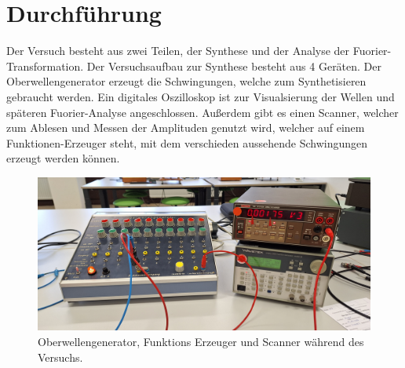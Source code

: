 \section{Durchführung}
\label{sec:Durchführung}
Der Versuch besteht aus zwei Teilen, der Synthese und der Analyse der Fuorier-Transformation.
Der Versuchsaufbau zur Synthese besteht aus 4 Geräten. Der Oberwellengenerator erzeugt die Schwingungen, welche zum 
Synthetisieren gebraucht werden. Ein digitales Oszilloskop ist zur Visualsierung der Wellen und späteren Fuorier-Analyse angeschlossen.
Außerdem gibt es einen Scanner, welcher zum Ablesen und Messen der Amplituden genutzt wird, welcher auf einem Funktionen-Erzeuger steht,
mit dem verschieden aussehende Schwingungen erzeugt werden können.
\begin{figure}
    \centering
    \includegraphics[width=\textwidth]{Messdaten_Bilder/Versuchsaufbau.jpg}
    \caption{Oberwellengenerator, Funktions Erzeuger und Scanner während des Versuchs.}
    \label{fig:Aufbau}
\end{figure}
